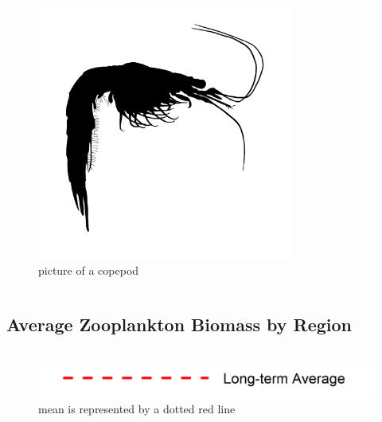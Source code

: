 \documentclass[
]{book}
\begin{document}
\begin{columns-nocenter}
\begin{column}
\begin{figure}
{\centering \includegraphics[width=3.31in]{figures/mysid} 

}

\caption{picture of a copepod}\label{fig:unnamed-chunk-163}
\end{figure}

\end{column}

\end{columns-nocenter}

\hypertarget{average-zooplankton-biomass-by-region}{%
\subsection{Average Zooplankton Biomass by Region}\label{average-zooplankton-biomass-by-region}}

\begin{columns-nocenter}

\begin{column}

\begin{figure}
\includegraphics[width=15.25in]{figures/mline} \caption{mean is represented by a dotted red line}\label{fig:unnamed-chunk-164}
\end{figure}

\end{column}

\begin{column}

\end{column}

\begin{column}

\end{column}

\end{columns-nocenter}
\end{document}
